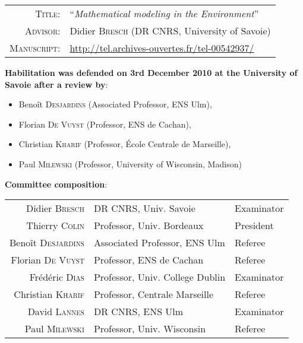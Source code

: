 \documentclass[final, a4paper, oneside, 12pt]{article}
\numberwithin{equation}{section}
\begin{document}
\begin{tabular}{rl}
  \textsc{Title:} & ``\textit{Mathematical modeling in the Environment}'' \\
  \textsc{Advisor:} & Didier \textsc{Bresch} (DR CNRS, University of Savoie) \\
  \textsc{Manuscript:} & \url{http://tel.archives-ouvertes.fr/tel-00542937/}
\end{tabular}

\vspace{0.3cm}

\textbf{Habilitation was defended on 3rd December 2010 at the University of Savoie after a review by}:
\begin{itemize}
  \item Beno\^it \textsc{Desjardins} (Associated Professor, ENS Ulm),
  \item Florian \textsc{De Vuyst} (Professor, ENS de Cachan),
  \item Christian \textsc{Kharif} (Professor, \'Ecole Centrale de Marseille),
  \item Paul \textsc{Milewski} (Professor, University of Wisconsin, Madison)
\end{itemize}

\vspace{1em}

\textbf{Committee composition}:

\vspace{1em}

\begin{tabular}{rll}
  Didier \textsc{Bresch} & DR CNRS, Univ. Savoie & Examinator \\
  Thierry \textsc{Colin} & Professor, Univ. Bordeaux & President \\
  Beno\^it \textsc{Desjardins} & Associated Professor, ENS Ulm & Referee \\
  Florian \textsc{De Vuyst} & Professor, ENS de Cachan & Referee \\
  Fr\'ed\'eric \textsc{Dias} & Professor, Univ. College Dublin & Examinator \\
  Christian \textsc{Kharif} & Professor, Centrale Marseille & Referee \\
  David \textsc{Lannes} & DR CNRS, ENS Ulm & Examinator \\
  Paul \textsc{Milewski} & Professor, Univ. Wisconsin & Referee \\
\end{tabular}

\vspace{1em}
\end{document}
